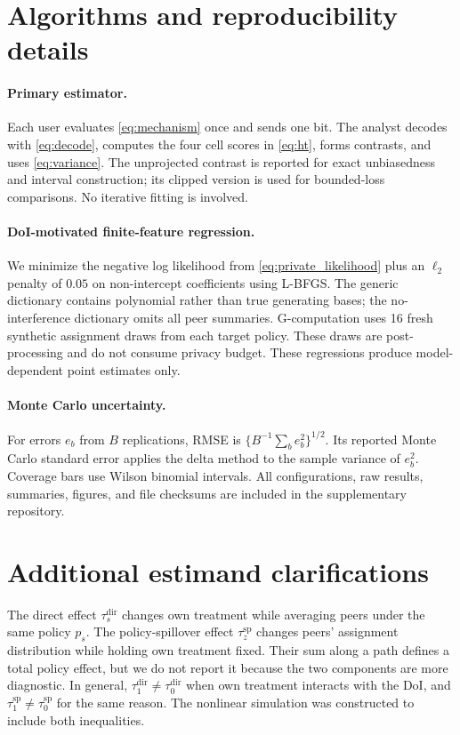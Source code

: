 \documentclass[11pt]{article}
\theoremstyle{definition}
\theoremstyle{remark}
\begin{document}
\section{Algorithms and reproducibility details}

\paragraph{Primary estimator.}
Each user evaluates \eqref{eq:mechanism} once and sends one bit. The analyst decodes with
\eqref{eq:decode}, computes the four cell scores in \eqref{eq:ht}, forms contrasts, and uses
\eqref{eq:variance}. The unprojected contrast is reported for exact unbiasedness and interval
construction; its clipped version is used for bounded-loss comparisons. No iterative fitting
is involved.

\paragraph{DoI-motivated finite-feature regression.}
We minimize the negative log likelihood from \eqref{eq:private_likelihood} plus an $\ell_2$
penalty of $0.05$ on non-intercept coefficients using L-BFGS. The generic dictionary contains
polynomial rather than true generating bases; the no-interference dictionary omits all peer
summaries. G-computation uses 16 fresh synthetic assignment draws from each target policy.
These draws are post-processing and do not consume privacy budget. These regressions produce
model-dependent point estimates only.

\paragraph{Monte Carlo uncertainty.}
For errors $e_b$ from $B$ replications, RMSE is
$\{B^{-1}\sum_b e_b^2\}^{1/2}$. Its reported Monte Carlo standard error applies the delta
method to the sample variance of $e_b^2$. Coverage bars use Wilson binomial intervals.
All configurations, raw results, summaries, figures, and file checksums are included in the
supplementary repository.

\section{Additional estimand clarifications}

The direct effect $\tau_s^{\mathrm{dir}}$ changes own treatment while averaging peers under the
same policy $p_s$. The policy-spillover effect $\tau_z^{\mathrm{sp}}$ changes peers' assignment
distribution while holding own treatment fixed. Their sum along a path defines a total policy
effect, but we do not report it because the two components are more diagnostic. In general,
$\tau_1^{\mathrm{dir}}\ne\tau_0^{\mathrm{dir}}$ when own treatment interacts with the DoI, and
$\tau_1^{\mathrm{sp}}\ne\tau_0^{\mathrm{sp}}$ for the same reason. The nonlinear simulation was
constructed to include both inequalities.



\end{document}
